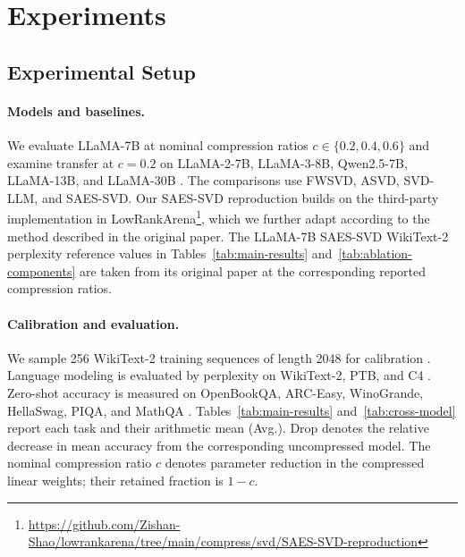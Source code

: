 \documentclass[11pt]{article}
\begin{document}
\section{Experiments}\label{sec:experiments}



\subsection{Experimental Setup}

\paragraph{Models and baselines.}
We evaluate LLaMA-7B at nominal compression ratios $c\in\{0.2,0.4,0.6\}$ and examine transfer at $c=0.2$ on LLaMA-2-7B, LLaMA-3-8B, Qwen2.5-7B, LLaMA-13B, and LLaMA-30B \citep{touvron2023llama,touvron2023llama2,dubey2024llama3,yang2024qwen25}. The comparisons use FWSVD, ASVD, SVD-LLM, and SAES-SVD. Our SAES-SVD reproduction builds on the third-party implementation in LowRankArena\footnote{\url{https://github.com/Zishan-Shao/lowrankarena/tree/main/compress/svd/SAES-SVD-reproduction}}, which we further adapt according to the method described in the original paper. The LLaMA-7B SAES-SVD WikiText-2 perplexity reference values in Tables~\ref{tab:main-results} and~\ref{tab:ablation-components} are taken from its original paper at the corresponding reported compression ratios.

\paragraph{Calibration and evaluation.}
We sample 256 WikiText-2 training sequences of length 2048 for calibration \citep{merity2017wikitext2}. Language modeling is evaluated by perplexity on WikiText-2, PTB, and C4 \citep{marcus1993ptb,raffel2020c4}. Zero-shot accuracy is measured on OpenBookQA, ARC-Easy, WinoGrande, HellaSwag, PIQA, and MathQA \citep{mihaylov2018openbook,clark2018think,sakaguchi2021winogrande,zellers2019hellaswag,bisk2020piqa,amini2019mathqa}. Tables~\ref{tab:main-results} and~\ref{tab:cross-model} report each task and their arithmetic mean (Avg.). Drop denotes the relative decrease in mean accuracy from the corresponding uncompressed model. The nominal compression ratio $c$ denotes parameter reduction in the compressed linear weights; their retained fraction is $1-c$.
\end{document}
